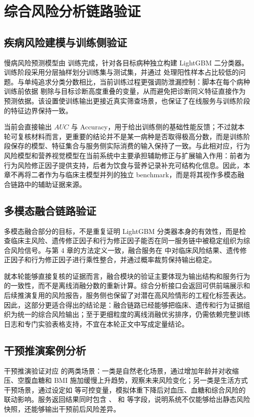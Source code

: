 \section{综合风险分析链路验证}
\subsection{疾病风险建模与训练侧验证}
慢病风险预测模型由  训练完成，针对各目标病种独立构建 LightGBM 二分类器。训练阶段采用分层抽样划分训练集与测试集，并通过  处理阳性样本占比较低的问题。与单纯追求分类分数相比，当前训练过程更强调防泄漏控制：脚本在每个病种训练前依据  剔除与目标诊断高度重叠的变量，从而避免把诊断同义特征直接作为预测依据。该设置使训练输出更接近真实筛查场景，也保证了在线服务与训练阶段的特征边界保持一致。

 当前会直接输出 $AUC$ 与 Accuracy，用于给出训练侧的基础性能反馈；不过就本轮可复核材料而言，更重要的结论并不是某一病种是否取得极高分数，而是训练阶段保存的模型、特征集合与服务侧实际消费的输入保持了一致。与此相对应，行为风险模型和营养视觉模型在当前系统中主要承担辅助修正与扩展输入作用：前者为行为风险修正因子提供支持，后者为饮食与营养记录补充可结构化信息。因此，本章不再将二者作为与临床主模型并列的独立 benchmark，而是将其视作多模态融合链路中的辅助证据来源。

\subsection{多模态融合链路验证}
多模态融合部分的目标，不是重复证明 LightGBM 分类器本身的有效性，而是检查临床主风险、遗传修正因子和行为修正因子能否在同一服务链中被稳定组织为综合风险信号。与第 4 章的方法定义一致，融合服务在  中对临床风险结果、遗传修正因子和行为修正因子进行乘性整合，并通过概率裁剪保持输出稳定。

就本轮能够直接复核的证据而言，融合模块的验证主要体现为输出结构和服务行为的一致性，而不是离线消融分数的重新计算。综合分析接口会返回可供前端展示和后续推演复用的风险报告，服务侧也保留了对潜在高风险情形的工程化标签表达。因此，这部分更适合得出的结论是：融合链路已经能够把临床、遗传和行为证据组织为统一的综合风险输出；至于更细粒度的离线消融优劣排序，仍需依赖完整训练日志和专门实验表格支持，不宜在本轮正文中写成定量结论。

\subsection{干预推演案例分析}
干预推演验证对应  的两类场景：一类是自然老化场景，通过增加年龄并对收缩压、空腹血糖和 BMI 施加缓慢上升趋势，观察未来风险变化；另一类是生活方式干预场景，通过设定如  等可控变量，模拟体重下降后对血压、血糖和综合风险的联动影响。服务返回结果同时包含 、 和  等字段，说明系统不仅能够给出静态风险快照，还能够输出干预前后风险差异。

